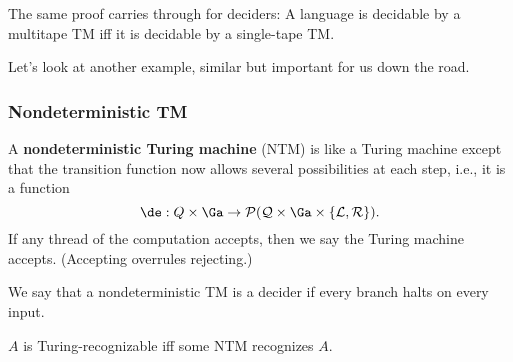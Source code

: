 \vskip0.15in
The same proof carries through for deciders: A language is decidable by a multitape TM iff it is decidable by a single-tape TM.

Let's look at another example, similar but important for us down the road.
\subsubsection{Nondeterministic TM}
\begin{df}
A \textbf{nondeterministic Turing machine} (NTM) is like a Turing machine except that the transition function now allows several possibilities at each step, i.e., it is a function
\[
\de:Q\times\Ga\to \cal P(Q\times \Ga\times \{L,R\}).
\]
If any thread of the computation accepts, then we say the Turing machine accepts. (Accepting overrules rejecting.) 

We say that a nondeterministic TM is a decider if every branch halts on every input.
\end{df}
\begin{thm}
$A$ is Turing-recognizable iff some NTM recognizes $A$. 
\end{thm}

